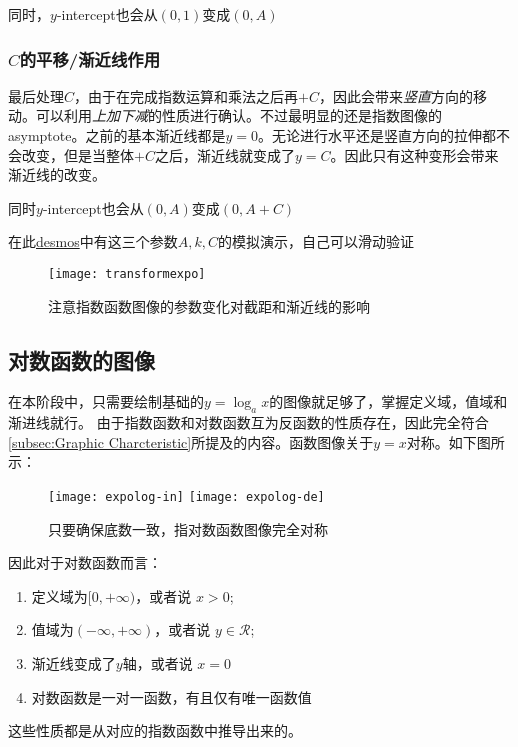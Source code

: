 同时，$y$-intercept也会从$(0,1)$变成$(0,A)$

\subsubsection*{$C$的平移/渐近线作用}
最后处理$C$，由于在完成指数运算和乘法之后再$+C$，因此会带来\emph{竖直}方向的移动。可以利用\emph{上加下减}的性质进行确认。不过最明显的还是指数图像的\gls{asymptote}。之前的基本渐近线都是$y=0$。无论进行水平还是竖直方向的拉伸都不会改变，但是当整体$+C$之后，渐近线就变成了$y=C$。因此只有这种变形会带来渐近线的改变。

同时$y$-intercept也会从$(0,A)$变成$(0,A+C)$

\begin{SummBox}
在此\href{https://www.desmos.com/calculator/qsbdrninpd}{desmos}中有这三个参数$A,k,C$的模拟演示，自己可以滑动验证
\begin{figure}[H]
\centering
\texttt{[image: transformexpo]}
\caption{注意指数函数图像的参数变化对截距和渐近线的影响}
\end{figure}
\end{SummBox}


\subsection*{对数函数的图像}
在本阶段中，只需要绘制基础的$y=\log_a x$的图像就足够了，掌握定义域，值域和渐进线就行。
由于指数函数和对数函数互为反函数的性质存在，因此完全符合\ref{subsec:Graphic Charcteristic}所提及的内容。函数图像关于$y=x$对称。如下图所示：
\begin{figure}[H]
\centering
\texttt{[image: expolog-in]}
\texttt{[image: expolog-de]}
\caption{只要确保底数一致，指对数函数图像完全对称}
\end{figure}

因此对于对数函数而言：
\begin{enumerate}[(1)]
\item 定义域为$[0,+\infty)$，或者说 $x>0$;
\item 值域为$(-\infty,+\infty)$，或者说 $y\in \mathcal{R}$;
\item 渐近线变成了$y$轴，或者说 $x=0$
\item 对数函数是一对一函数，有且仅有唯一函数值
\end{enumerate}
这些性质都是从对应的指数函数中推导出来的。
\clearpage

